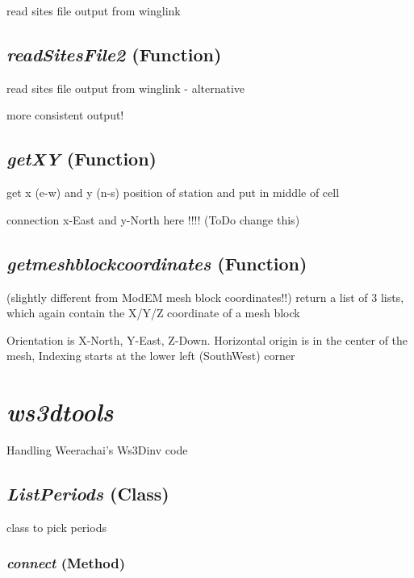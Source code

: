 read sites file output from winglink

\subsection{\textit{readSitesFile2} (Function)}
\label{ssec:.modeling.winglinktools.readSitesFile2}

read sites file output from winglink - alternative

more consistent output!

\subsection{\textit{getXY} (Function)}
\label{ssec:.modeling.winglinktools.getXY}

get x (e-w) and y (n-s) position of station and put in middle of cell

connection x-East and y-North here !!!! (ToDo change this)

\subsection{\textit{getmeshblockcoordinates} (Function)}
\label{ssec:.modeling.winglinktools.getmeshblockcoordinates}

(slightly different from ModEM mesh block coordinates!!)
return a list of 3 lists, which again contain the X/Y/Z coordinate of a mesh block

    Orientation is X-North, Y-East, Z-Down.
    Horizontal origin is in the center of the mesh,
    Indexing starts at the lower left (SouthWest) corner



\section{\textit{ws3dtools} }
\label{sec:modeling.ws3dtools}

Handling Weerachai's Ws3Dinv code


\subsection{\textit{ListPeriods} (Class)}
\label{ssec:modeling.ws3dtools.ListPeriods}

class to pick periods

\subsubsection{\textit{connect} (Method)}
\label{sssec:modeling.ws3dtools.ListPeriods.connect}

